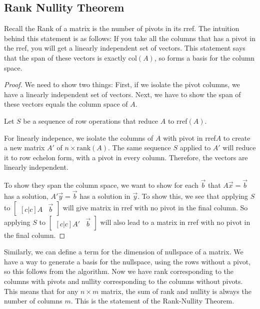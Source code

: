\subsection*{Rank Nullity Theorem}
Recall the Rank of a matrix is the number of pivots in its rref. 
The intuition behind this statement is as follows: If you take all the columns that has a pivot in the rref, you will get a linearly independent set of vectors. This statement says that the span of these vectors is exactly col$(A)$, so forms a basis for the column space.  
\begin{proof}
	We need to show two things: First, if we isolate the pivot columns, we have a linearly independent set of vectors. Next, we have to show the span of these vectors equals the column space of $A$.
	
	Let $S$ be a sequence of row operations that reduce $A$ to rref$(A)$.

	For linearly indepence, we isolate the columns of $A$ with pivot in rref$A$ to create a new matrix $A'$ of $n\times \textrm{rank}(A)$. The same sequence $S$ applied to $A'$ will reduce it to row echelon form, with a pivot in every column. Therefore, the vectors are linearly independent. 

	To show they span the column space, we want to show for each $\vec{b}$ that $A\vec{x}=\vec{b}$ has a solution, $A'\vec{y}=\vec{b}$ has a solution in $\vec{y}$. To show this, we see that applying $S$ to $
	\begin{bmatrix}[c|c]
		A &\vec{b}
	\end{bmatrix}
	$
	will give matrix in rref with no pivot in the final column. So applying $S$ to $\begin{bmatrix}[c|c]
		A' &\vec{b}
	\end{bmatrix}
	$
	will also lead to a matrix in rref with no pivot in the final column.
\end{proof}
Similarly, we can define a term for the dimension of nullspace of a matrix. 
We have a way to generate a basis for the nullspace, using the rows without a pivot, so this follows from the algorithm. 
Now we have rank corresponding to the columns with pivots and nullity corresponding to the columns without pivots. This means that for any $n\times m$ matrix, the sum of rank and nullity is always the number of columns $m$. This is the statement of the Rank-Nullity Theorem. 

